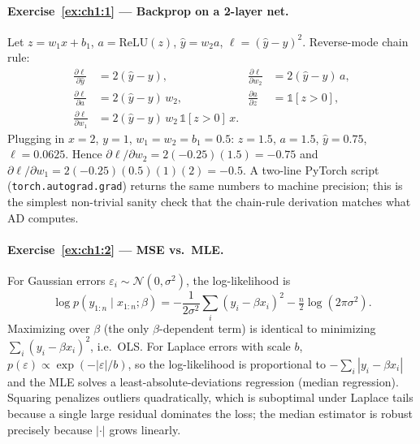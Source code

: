 \documentclass[11pt,a4paper]{report}
\begin{document}
\paragraph{Exercise~\ref{ex:ch1:1} --- Backprop on a 2-layer net.}
Let $z = w_1 x + b_1$, $a = \mathrm{ReLU}(z)$, $\hat y = w_2 a$, $\ell = (\hat y - y)^2$.  Reverse-mode chain rule:
\begin{align*}
\frac{\partial \ell}{\partial \hat y} &= 2(\hat y - y), &
\frac{\partial \ell}{\partial w_2} &= 2(\hat y - y)\,a, \\
\frac{\partial \ell}{\partial a} &= 2(\hat y - y)\,w_2, &
\frac{\partial a}{\partial z} &= \mathbb{1}[z > 0], \\
\frac{\partial \ell}{\partial w_1} &= 2(\hat y - y)\,w_2\,\mathbb{1}[z>0]\,x.
\end{align*}
Plugging in $x=2$, $y=1$, $w_1 = w_2 = b_1 = 0.5$: $z = 1.5$, $a = 1.5$, $\hat y = 0.75$, $\ell = 0.0625$.  Hence $\partial\ell/\partial w_2 = 2(-0.25)(1.5) = -0.75$ and $\partial\ell/\partial w_1 = 2(-0.25)(0.5)(1)(2) = -0.5$.  A two-line PyTorch script (\texttt{torch.autograd.grad}) returns the same numbers to machine precision; this is the simplest non-trivial sanity check that the chain-rule derivation matches what AD computes.

\paragraph{Exercise~\ref{ex:ch1:2} --- MSE vs.\ MLE.}
For Gaussian errors $\varepsilon_i \sim \mathcal{N}(0, \sigma^2)$, the log-likelihood is
\[
\log p(y_{1:n} \mid x_{1:n}; \beta) = -\frac{1}{2\sigma^2}\sum_i (y_i - \beta x_i)^2 - \tfrac{n}{2}\log(2\pi\sigma^2).
\]
Maximizing over $\beta$ (the only $\beta$-dependent term) is identical to minimizing $\sum_i (y_i - \beta x_i)^2$, i.e.\ OLS.  For Laplace errors with scale $b$, $p(\varepsilon) \propto \exp(-|\varepsilon|/b)$, so the log-likelihood is proportional to $-\sum_i |y_i - \beta x_i|$ and the MLE solves a least-absolute-deviations regression (median regression).  Squaring penalizes outliers quadratically, which is suboptimal under Laplace tails because a single large residual dominates the loss; the median estimator is robust precisely because $|\cdot|$ grows linearly.
\end{document}
